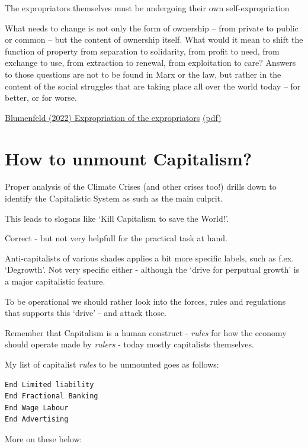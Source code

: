 \documentclass[
]{book}
\begin{document}
The expropriators themselves must be undergoing their own self-expropriation

What needs to change is not only the form of ownership -- from private to public or
common -- but the content of ownership itself. What would it mean to shift the
function of property from separation to solidarity, from proﬁt to need,
from exchange to use, from extraction to renewal, from exploitation to care?
Answers to those questions are not to be found in Marx or the law, but rather in
the content of the social struggles that are taking
place all over the world today -- for better, or for worse.

\href{https://journals.sagepub.com/doi/10.1177/01914537211059513}{Blumenfeld (2022) Expropriation of the expropriators}
\href{pdf/Blumenfeld_2022_Expropriation_of_the_expropriators.pdf}{(pdf)}

\hypertarget{how-to-unmount-capitalism}{%
\chapter{How to unmount Capitalism?}\label{how-to-unmount-capitalism}}

Proper analysis of the Climate Crises (and other crises too!)
drills down to identify the Capitalistic System as such as the main culprit.

This leads to slogans like `Kill Capitalism to save the World!'.

Correct - but not very helpfull for the practical task at hand.

Anti-capitalists of various shades applies a bit more specific labels,
such as f.ex. `Degrowth'.
Not very specific either - although the `drive for perputual growth'
is a major capitalistic feature.

To be operational we should rather look into the forces, rules and regulations
that supports this `drive' - and attack those.

Remember that Capitalism is a human construct - \emph{rules} for how the economy
should operate made by \emph{rulers} - today mostly capitalists themselves.

My list of capitalist \emph{rules} to be unmounted goes as follows:

\begin{verbatim}
End Limited liability
End Fractional Banking
End Wage Labour
End Advertising
\end{verbatim}

More on these below:
\end{document}

